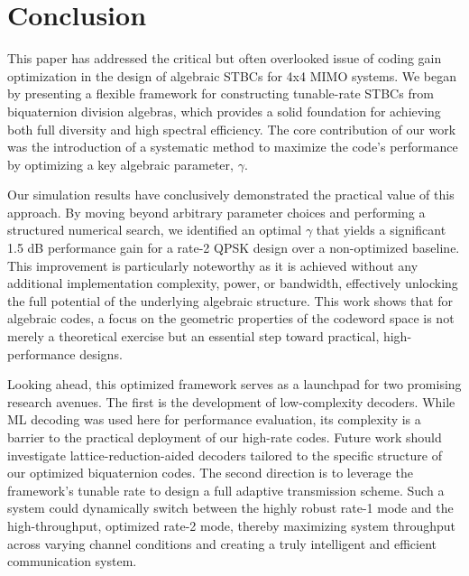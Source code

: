 \section{Conclusion}
This paper has addressed the critical but often overlooked issue of coding gain optimization in the design of algebraic STBCs for 4x4 MIMO systems. We began by presenting a flexible framework for constructing tunable-rate STBCs from biquaternion division algebras, which provides a solid foundation for achieving both full diversity and high spectral efficiency. The core contribution of our work was the introduction of a systematic method to maximize the code's performance by optimizing a key algebraic parameter, \(\gamma\).

Our simulation results have conclusively demonstrated the practical value of this approach. By moving beyond arbitrary parameter choices and performing a structured numerical search, we identified an optimal \(\gamma\) that yields a significant 1.5 dB performance gain for a rate-2 QPSK design over a non-optimized baseline. This improvement is particularly noteworthy as it is achieved without any additional implementation complexity, power, or bandwidth, effectively unlocking the full potential of the underlying algebraic structure. This work shows that for algebraic codes, a focus on the geometric properties of the codeword space is not merely a theoretical exercise but an essential step toward practical, high-performance designs.

Looking ahead, this optimized framework serves as a launchpad for two promising research avenues. The first is the development of low-complexity decoders. While ML decoding was used here for performance evaluation, its complexity is a barrier to the practical deployment of our high-rate codes. Future work should investigate lattice-reduction-aided decoders tailored to the specific structure of our optimized biquaternion codes. The second direction is to leverage the framework's tunable rate to design a full adaptive transmission scheme. Such a system could dynamically switch between the highly robust rate-1 mode and the high-throughput, optimized rate-2 mode, thereby maximizing system throughput across varying channel conditions and creating a truly intelligent and efficient communication system.
